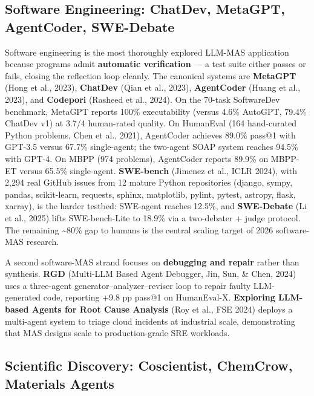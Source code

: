 \subsection{Software Engineering: ChatDev, MetaGPT, AgentCoder, SWE-Debate}\label{software-engineering-chatdev-metagpt-agentcoder-swe-debate}

Software engineering is the most thoroughly explored LLM-MAS application because programs admit \textbf{automatic verification} --- a test suite either passes or fails, closing the reflection loop cleanly. The canonical systems are \textbf{MetaGPT} (Hong et al., 2023), \textbf{ChatDev} (Qian et al., 2023), \textbf{AgentCoder} (Huang et al., 2023), and \textbf{Codepori} (Rasheed et al., 2024). On the 70-task SoftwareDev benchmark, MetaGPT reports 100\% executability (versus 4.6\% AutoGPT, 79.4\% ChatDev v1) at 3.7/4 human-rated quality. On HumanEval (164 hand-curated Python problems, Chen et al., 2021), AgentCoder achieves 89.0\% pass@1 with GPT-3.5 versus 67.7\% single-agent; the two-agent SOAP system reaches 94.5\% with GPT-4. On MBPP (974 problems), AgentCoder reports 89.9\% on MBPP-ET versus 65.5\% single-agent. \textbf{SWE-bench} (Jimenez et al., ICLR 2024), with 2,294 real GitHub issues from 12 mature Python repositories (django, sympy, pandas, scikit-learn, requests, sphinx, matplotlib, pylint, pytest, astropy, flask, xarray), is the harder testbed: SWE-agent reaches 12.5\%, and \textbf{SWE-Debate} (Li et al., 2025) lifts SWE-bench-Lite to 18.9\% via a two-debater + judge protocol. The remaining \textasciitilde80\% gap to humans is the central scaling target of 2026 software-MAS research.

A second software-MAS strand focuses on \textbf{debugging and repair} rather than synthesis. \textbf{RGD} (Multi-LLM Based Agent Debugger, Jin, Sun, \& Chen, 2024) uses a three-agent generator--analyzer--reviser loop to repair faulty LLM-generated code, reporting +9.8 pp pass@1 on HumanEval-X. \textbf{Exploring LLM-based Agents for Root Cause Analysis} (Roy et al., FSE 2024) deploys a multi-agent system to triage cloud incidents at industrial scale, demonstrating that MAS designs scale to production-grade SRE workloads.

\subsection{Scientific Discovery: Coscientist, ChemCrow, Materials Agents}\label{scientific-discovery-coscientist-chemcrow-materials-agents}

